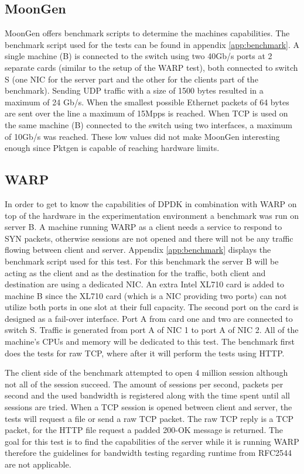 \subsection{MoonGen}
MoonGen offers benchmark scripts to determine the machines capabilities. 
The benchmark script used for the tests can be found in appendix \ref{app:benchmark}. 
A single machine (B) is connected to the switch using two 40Gb/s ports at 2 separate cards (similar to the setup of the WARP test), both connected to switch S (one NIC for the server part and the other for the clients part of the benchmark). Sending UDP traffic with a size of 1500 bytes resulted in a maximum of 24 Gb/s. When the smallest possible Ethernet packets of 64 bytes are sent over the line a maximum of 15Mpps is reached. When TCP is used on the same machine (B) connected to the switch using two interfaces, a maximum of 10Gb/s was reached. These low values did not make MoonGen interesting enough since Pktgen is capable of reaching hardware limits. 

\subsection{WARP}\label{sub:warp}
In order to get to know the capabilities of DPDK in combination with WARP on top of the hardware in the experimentation environment a benchmark was run on server B.
A machine running WARP as a client needs a service to respond to SYN packets, otherwise sessions are not opened and there will not be any traffic flowing between client and server. 
Appendix \ref{app:benchmark} displays the benchmark script used for this test.
For this benchmark the server B  will be acting as the client and as the destination for the traffic, both client and destination are using a dedicated NIC. 
An extra Intel XL710 card is added to machine B since the XL710 card (which is a NIC providing two ports) can not utilize both ports in one slot at their full capacity\cite{intellinuxguidxl710}.
The second port on the card is designed as a fail-over interface. 
Port A from card one and two are connected to switch S. 
Traffic is generated from port A of NIC 1 to port A of NIC 2.
All of the machine's CPUs and memory will be dedicated to this test. 
The benchmark first does the tests for raw TCP, where after it will perform the tests using HTTP.

The client side of the benchmark attempted to open 4 million session although not all of the session succeed.
The amount of sessions per second, packets per second and the used bandwidth is registered along with the time spent until all sessions are tried. 
When a TCP session is opened between client and server, the tests will request a file or send a raw TCP packet.
The raw TCP reply is a TCP packet, for the HTTP file request a padded 200-OK message is returned. 
The goal for this test is to find the capabilities of the server while it is running WARP therefore the guidelines for bandwidth testing regarding runtime from RFC2544 are not applicable. 


